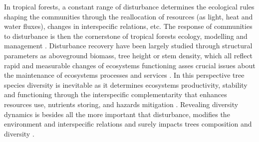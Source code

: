 \documentclass[fleqn,10pt]{ArtEcoFoG} %
\theoremstyle{definition}
\theoremstyle{definition}
\theoremstyle{definition}
\theoremstyle{remark}
\begin{document}
In tropical forests, a constant range of disturbance determines the
ecological rules shaping the communities through the reallocation of
resources (as light, heat and water fluxes), changes in interspecific
relations, etc. The response of communities to disturbance is then the
cornerstone of tropical forests ecology, modelling and management
\citep{White2001, Chazdon2003a}. Disturbance recovery have been largely
studied through structural parameters as aboveground biomass, tree
height or stem density, which all reflect rapid and measurable changes
of ecosystems functioning asses crucial issues about the maintenance of
ecosystems processes and services
\citep{Denslow2000, Blanc2009, Rutishauser2016}. In this perspective
tree species diversity is inevitable as it determines ecosystems
productivity, stability and functioning through the interspecific
complementarity that enhances resources use, nutrients storing, and
hazards mitigation \citep{Tilman2014}. Revealing diversity dynamics is
besides all the more important that disturbance, modifies the
environment and interspecific relations and surely impacts trees
composition and diversity \citep{CazzollaGatti2014}.
\end{document}
